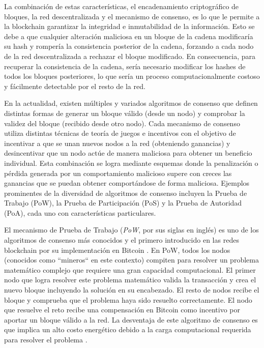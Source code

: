 La combinación de estas características, el encadenamiento criptográfico de bloques, la red descentralizada y el mecanismo de consenso, es lo que le permite a la blockchain garantizar la integridad e inmutabilidad de la información. Esto se debe a que cualquier alteración maliciosa en un bloque de la cadena modificaría su hash y rompería la consistencia posterior de la cadena, forzando a cada nodo de la red descentralizada a rechazar el bloque modificado. En consecuencia, para recuperar la consistencia de la cadena, sería necesario modificar los hashes de todos los bloques posteriores, lo que sería un proceso computacionalmente costoso y fácilmente detectable por el resto de la red.

En la actualidad, existen múltiples y variados algoritmos de consenso que definen distintas formas de generar un bloque válido (desde un nodo) y comprobar la validez del bloque (recibido desde otro nodo). Cada mecanismo de consenso utiliza distintas técnicas de teoría de juegos e incentivos con el objetivo de incentivar a que se unan nuevos nodos a la red (obteniendo ganancias) y desincentivar que un nodo actúe de manera maliciosa para obtener un beneficio individual. Esta combinación se logra mediante esquemas donde la penalización o pérdida generada por un comportamiento malicioso supere con creces las ganancias que se puedan obtener comportándose de forma maliciosa. Ejemplos prominentes de la diversidad de algoritmos de consenso incluyen la Prueba de Trabajo (PoW), la Prueba de Participación (PoS) y la Prueba de Autoridad (PoA), cada uno con características particulares.

El mecanismo de Prueba de Trabajo (\textit{PoW}, por sus siglas en inglés) es uno de los algoritmos de consenso más conocidos y el primero introducido en las redes blockchain por su implementación en Bitcoin \cite{satoshi2008bitcoin}. En PoW, todos los nodos (conocidos como ``mineros`` en este contexto) compiten para resolver un problema matemático complejo que requiere una gran capacidad computacional. El primer nodo que logra resolver este problema matemático valida la transacción y crea el nuevo bloque incluyendo la solución en su encabezado. El resto de nodos recibe el bloque y comprueba que el problema haya sido resuelto correctamente. El nodo que resuelve el reto recibe una compensación en Bitcoin como incentivo por aportar un bloque válido a la red. La desventaja de este algoritmo de consenso es que implica un alto costo energético debido a la carga computacional requerida para resolver el problema \cite{pending}.

